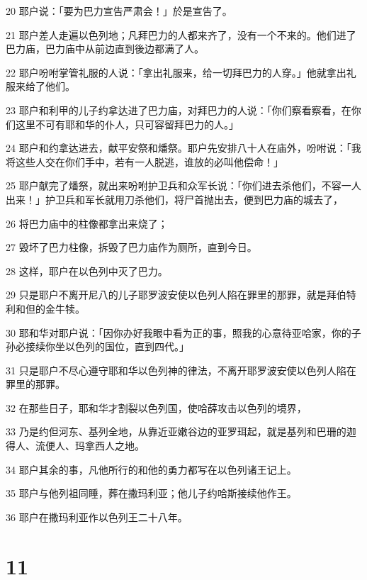 \par 20 耶户说：「要为巴力宣告严肃会！」於是宣告了。
\par 21 耶户差人走遍以色列地；凡拜巴力的人都来齐了，没有一个不来的。他们进了巴力庙，巴力庙中从前边直到後边都满了人。
\par 22 耶户吩咐掌管礼服的人说：「拿出礼服来，给一切拜巴力的人穿。」他就拿出礼服来给了他们。
\par 23 耶户和利甲的儿子约拿达进了巴力庙，对拜巴力的人说：「你们察看察看，在你们这里不可有耶和华的仆人，只可容留拜巴力的人。」
\par 24 耶户和约拿达进去，献平安祭和燔祭。耶户先安排八十人在庙外，吩咐说：「我将这些人交在你们手中，若有一人脱逃，谁放的必叫他偿命！」
\par 25 耶户献完了燔祭，就出来吩咐护卫兵和众军长说：「你们进去杀他们，不容一人出来！」护卫兵和军长就用刀杀他们，将尸首抛出去，便到巴力庙的城去了，
\par 26 将巴力庙中的柱像都拿出来烧了；
\par 27 毁坏了巴力柱像，拆毁了巴力庙作为厕所，直到今日。
\par 28 这样，耶户在以色列中灭了巴力。
\par 29 只是耶户不离开尼八的儿子耶罗波安使以色列人陷在罪里的那罪，就是拜伯特利和但的金牛犊。
\par 30 耶和华对耶户说：「因你办好我眼中看为正的事，照我的心意待亚哈家，你的子孙必接续你坐以色列的国位，直到四代。」
\par 31 只是耶户不尽心遵守耶和华以色列神的律法，不离开耶罗波安使以色列人陷在罪里的那罪。
\par 32 在那些日子，耶和华才割裂以色列国，使哈薛攻击以色列的境界，
\par 33 乃是约但河东、基列全地，从靠近亚嫩谷边的亚罗珥起，就是基列和巴珊的迦得人、流便人、玛拿西人之地。
\par 34 耶户其余的事，凡他所行的和他的勇力都写在以色列诸王记上。
\par 35 耶户与他列祖同睡，葬在撒玛利亚；他儿子约哈斯接续他作王。
\par 36 耶户在撒玛利亚作以色列王二十八年。

\chapter{11}

